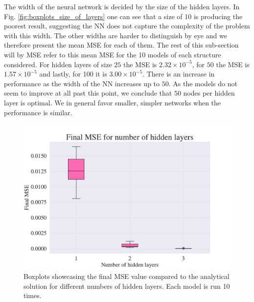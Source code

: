 
The width of the neural network is decided by the size of the hidden layers.
In Fig. \ref{fig:boxplots_size_of_layers} one can see that a size of 10 is producing the poorest result, suggesting the NN does not capture the complexity of the problem with this width. 
The other widths are harder to distinguish by eye and we therefore present the mean MSE for each of them. 
The rest of this sub-section will by MSE refer to this mean MSE for the 10 models of each structure considered.
For hidden layers of size $25$ the MSE is $2.32 \times 10^{-5}$, for $50$ the MSE is $1.57 \times 10^{-5}$ and lastly, for 100 it is $3.00 \times 10^{-5}$.
There is an increase in performance as the width of the NN increases up to $50$. 
As the models do not seem to improve at all past this point, we conclude that $50$ nodes per hidden layer is optimal.
We in general favor smaller, simpler networks when the performance is similar.

\begin{figure}[h!]
    \centering
    \includegraphics[width=1.0\linewidth]{project_3/plots/n_layers_search.pdf}
    \caption{Boxplots showcasing the final MSE value compared to the analytical solution for different numbers of hidden layers. Each model is run 10 times.}
    \label{fig:boxplots_number_of_hidden_layers}
\end{figure}


